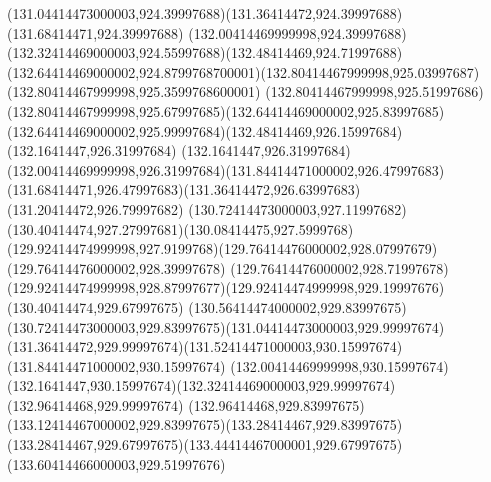 {{	\curveto(131.04414473000003,924.39997688)(131.36414472,924.39997688)(131.68414471,924.39997688)
	\curveto(132.00414469999998,924.39997688)(132.32414469000003,924.55997688)(132.48414469,924.71997688)
	\curveto(132.64414469000002,924.8799768700001)(132.80414467999998,925.03997687)(132.80414467999998,925.3599768600001)
	\curveto(132.80414467999998,925.51997686)(132.80414467999998,925.67997685)(132.64414469000002,925.83997685)
	\curveto(132.64414469000002,925.99997684)(132.48414469,926.15997684)(132.1641447,926.31997684)
	\curveto(132.1641447,926.31997684)(132.00414469999998,926.31997684)(131.84414471000002,926.47997683)
	\curveto(131.68414471,926.47997683)(131.36414472,926.63997683)(131.20414472,926.79997682)
	\curveto(130.72414473000003,927.11997682)(130.40414474,927.27997681)(130.08414475,927.5999768)
	\curveto(129.92414474999998,927.9199768)(129.76414476000002,928.07997679)(129.76414476000002,928.39997678)
	\curveto(129.76414476000002,928.71997678)(129.92414474999998,928.87997677)(129.92414474999998,929.19997676)
	\lineto(130.40414474,929.67997675)
	\curveto(130.56414474000002,929.83997675)(130.72414473000003,929.83997675)(131.04414473000003,929.99997674)
	\curveto(131.36414472,929.99997674)(131.52414471000003,930.15997674)(131.84414471000002,930.15997674)
	\curveto(132.00414469999998,930.15997674)(132.1641447,930.15997674)(132.32414469000003,929.99997674)
	\lineto(132.96414468,929.99997674)
	\curveto(132.96414468,929.83997675)(133.12414467000002,929.83997675)(133.28414467,929.83997675)
	\curveto(133.28414467,929.67997675)(133.44414467000001,929.67997675)(133.60414466000003,929.51997676)
	\closepath
}
}
{
}
{
}
{
}
